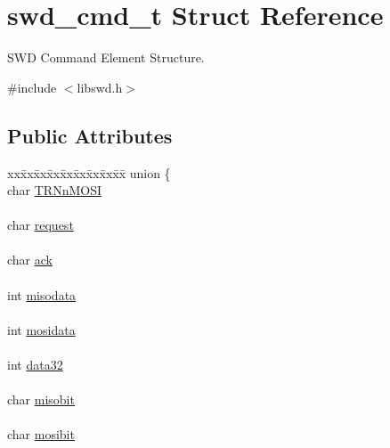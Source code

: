 \hypertarget{structswd__cmd__t}{
\section{swd\_\-cmd\_\-t Struct Reference}
\label{structswd__cmd__t}
}


SWD Command Element Structure.  




{\ttfamily \#include $<$libswd.h$>$}

\subsection*{Public Attributes}
\begin{DoxyCompactItemize}
\item 
\hypertarget{structswd__cmd__t_a6ffacafbf5e1160e81a4ae1e650c724f}{
\begin{tabbing}
xx\=xx\=xx\=xx\=xx\=xx\=xx\=xx\=xx\=\kill
union \{\\
\>char \hyperlink{structswd__cmd__t_ad5990fe329230159af56a95378b206ef}{TRNnMOSI}\\
\>\\
\>char \hyperlink{structswd__cmd__t_a78267c4aaaed43ef5d38617cd0632135}{request}\\
\>\\
\>char \hyperlink{structswd__cmd__t_a564daefcae1870dc3110fe1ef2d2fb02}{ack}\\
\>\\
\>int \hyperlink{structswd__cmd__t_ab4bdc51a77d6beb63af8cb9d466e731f}{misodata}\\
\>\\
\>int \hyperlink{structswd__cmd__t_a35f88591bec4b8aa2e3e93e289ef3ee1}{mosidata}\\
\>\\
\>int \hyperlink{structswd__cmd__t_ad2bab20a395056e71fb45c3ede25418e}{data32}\\
\>\\
\>char \hyperlink{structswd__cmd__t_aad2959ff43a559dd230664cce4c62289}{misobit}\\
\>\\
\>char \hyperlink{structswd__cmd__t_abb4d4c34e0559fa73e849a887ef2e29f}{mosibit}\\

\end{tabbing}}
\end{DoxyCompactItemize}
